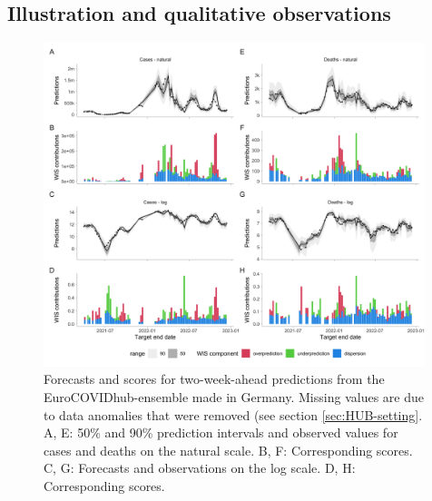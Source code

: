 \documentclass{article}
\begin{document}
\subsection{Illustration and qualitative observations}

\begin{figure}[h!]
    \centering
    \includegraphics[width=0.99\textwidth]{output/figures/HUB-model-comparison-ensemble.png}
    \caption{
    Forecasts and scores for two-week-ahead predictions from the EuroCOVIDhub-ensemble made in Germany. Missing values are due to data anomalies that were removed (see section \ref{sec:HUB-setting}. 
    A, E: 50\% and 90\% prediction intervals and observed values for cases and deaths on the natural scale. B, F: Corresponding scores. C, G: Forecasts and observations on the log scale. D, H: Corresponding scores. 
    }
    \label{fig:HUB-model-comparison-ensemble}
\end{figure}
\end{document}
